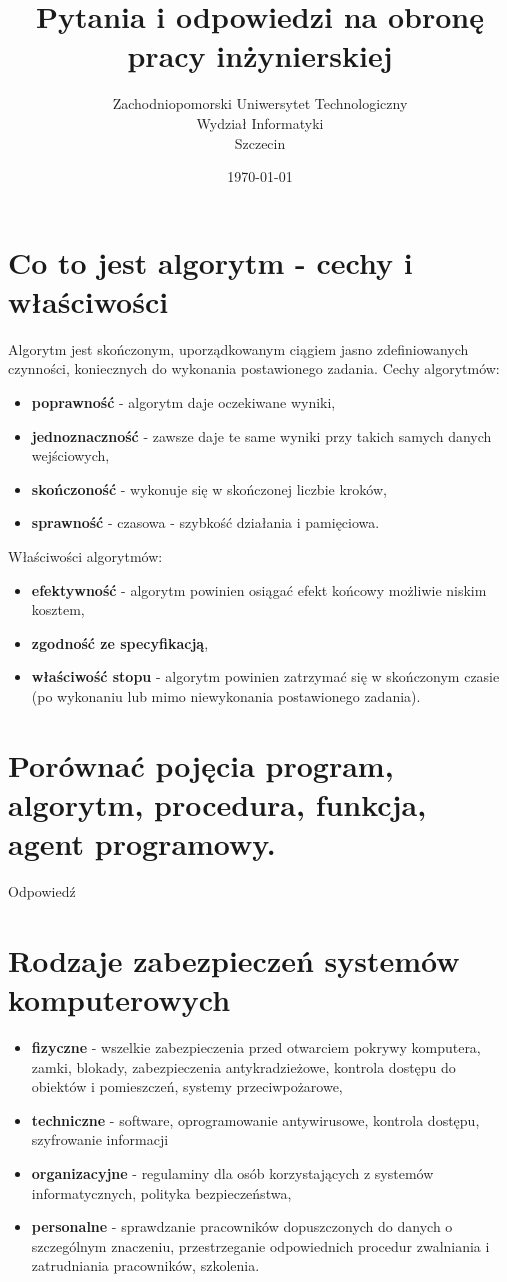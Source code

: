 \documentclass[12pt,a4paper]{article}
\title{Pytania i odpowiedzi na obronę pracy inżynierskiej}
\author{
	Zachodniopomorski Uniwersytet Technologiczny\\
	Wydział Informatyki\\
	Szczecin
}
\date{\today}
\begin{document}
	\maketitle

	\section{Co to jest algorytm - cechy i właściwości}
	Algorytm jest skończonym, uporządkowanym ciągiem jasno zdefiniowanych czynności, koniecznych do wykonania postawionego  zadania.
	Cechy algorytmów:
	\begin{itemize}
		\item \textbf{poprawność} - algorytm daje oczekiwane wyniki,
		\item \textbf{jednoznaczność} - zawsze daje te same wyniki przy takich samych danych wejściowych,
		\item \textbf{skończoność} - wykonuje się w skończonej liczbie kroków,
		\item \textbf{sprawność} - czasowa - szybkość działania i pamięciowa.
	\end{itemize}
	Właściwości algorytmów:
	\begin{itemize}
		\item \textbf{efektywność} - algorytm powinien osiągać efekt końcowy możliwie niskim kosztem,
		\item \textbf{zgodność ze specyfikacją},
		\item \textbf{właściwość stopu} - algorytm powinien zatrzymać się w skończonym czasie (po wykonaniu lub mimo niewykonania postawionego zadania).
	\end{itemize}

	\section{Porównać pojęcia program, algorytm, procedura, funkcja, agent programowy.}
	Odpowiedź

	\section{Rodzaje zabezpieczeń systemów komputerowych}
	\begin{itemize}
		\item \textbf{fizyczne} - wszelkie zabezpieczenia przed otwarciem pokrywy komputera, zamki, blokady, zabezpieczenia antykradzieżowe, kontrola dostępu do obiektów i pomieszczeń, systemy przeciwpożarowe,
		\item \textbf{techniczne} - software, oprogramowanie antywirusowe, kontrola dostępu, szyfrowanie informacji
		\item \textbf{organizacyjne} - regulaminy dla osób korzystających z systemów informatycznych, polityka bezpieczeństwa,
		\item \textbf{personalne} - sprawdzanie pracowników dopuszczonych do danych o szczególnym znaczeniu, przestrzeganie odpowiednich procedur zwalniania i zatrudniania pracowników, szkolenia.
	\end{itemize}
\end{document}
